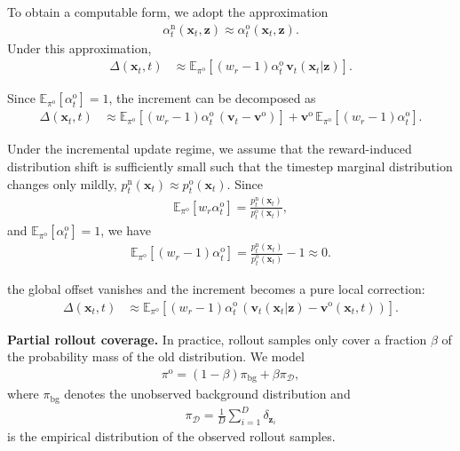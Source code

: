 \documentclass{article} %
\begin{document}
To obtain a computable form, we adopt the approximation
\begin{align}
\alpha_t^{\mathrm{n}}(\mathbf{x}_t,\mathbf{z})
\approx
\alpha_t^{\mathrm{o}}(\mathbf{x}_t,\mathbf{z}).
\end{align}
Under this approximation,
\begin{align}
\Delta(\mathbf{x}_t,t)
&\approx
\mathbb{E}_{\pi^{\mathrm{o}}}
\left[
(w_r-1)\alpha_t^{\mathrm{o}}\,
\mathbf{v}_t(\mathbf{x}_t|\mathbf{z})
\right].
\end{align}

Since $\mathbb{E}_{\pi^{\mathrm{o}}}[\alpha_t^{\mathrm{o}}]=1$,
the increment can be decomposed as
\begin{align}
\Delta(\mathbf{x}_t,t)
&\approx
\mathbb{E}_{\pi^{\mathrm{o}}}
\left[
(w_r-1)\alpha_t^{\mathrm{o}}\,
\left(
\mathbf{v}_t-\mathbf{v}^{\mathrm{o}}
\right)
\right]
+
\mathbf{v}^{\mathrm{o}}\,
\mathbb{E}_{\pi^{\mathrm{o}}}
\left[
(w_r-1)\alpha_t^{\mathrm{o}}
\right].
\end{align}

Under the incremental update regime, we assume that the reward-induced
distribution shift is sufficiently small such that the timestep marginal
distribution changes only mildly,
$p_t^{\mathrm{n}}(\mathbf{x}_t)
\approx
p_t^{\mathrm{o}}(\mathbf{x}_t)$.
Since
\begin{align}
\mathbb{E}_{\pi^{\mathrm{o}}}
\left[
w_r\alpha_t^{\mathrm{o}}
\right]
=
\frac{
p_t^{\mathrm{n}}(\mathbf{x}_t)
}{
p_t^{\mathrm{o}}(\mathbf{x}_t)
},
\end{align}
and
$\mathbb{E}_{\pi^{\mathrm{o}}}
[\alpha_t^{\mathrm{o}}]=1$,
we have
\begin{align}
\mathbb{E}_{\pi^{\mathrm{o}}}
\left[
(w_r-1)\alpha_t^{\mathrm{o}}
\right]
=
\frac{
p_t^{\mathrm{n}}(\mathbf{x}_t)
}{
p_t^{\mathrm{o}}(\mathbf{x}_t)
}
-1
\approx
0.
\end{align}


the global offset vanishes and the increment becomes a pure local
correction:
\begin{align}
\Delta(\mathbf{x}_t,t)
&\approx
\mathbb{E}_{\pi^{\mathrm{o}}}
\left[
(w_r-1)\alpha_t^{\mathrm{o}}\,
\left(
\mathbf{v}_t(\mathbf{x}_t|\mathbf{z})
-
\mathbf{v}^{\mathrm{o}}(\mathbf{x}_t,t)
\right)
\right].
\end{align}



\noindent\textbf{Partial rollout coverage.}
In practice, rollout samples only cover a fraction $\beta$ of the probability
mass of the old distribution. We model
\begin{align}
\pi^{\mathrm{o}}
=
(1-\beta)\pi_{\mathrm{bg}}
+
\beta\pi_{\mathcal D},
\end{align}
where $\pi_{\mathrm{bg}}$ denotes the unobserved background distribution and
\begin{align}
\pi_{\mathcal D}
=
\frac{1}{D}
\sum_{i=1}^{D}
\delta_{\mathbf z_i}
\end{align}
is the empirical distribution of the observed rollout samples.
\end{document}
